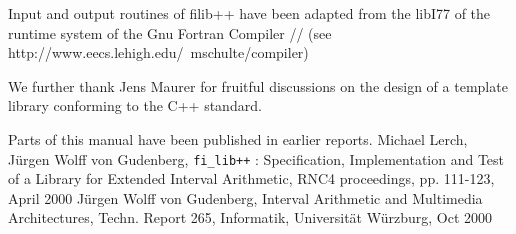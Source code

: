 \documentclass{report}
\begin{document}
\begin{thebibliography}{99}
Input and output routines of filib++ have been adapted from the libI77
of the
runtime system of the Gnu Fortran Compiler
// (see http://www.eecs.lehigh.edu/~mschulte/compiler)

We further thank Jens Maurer for fruitful discussions on the design of
a template library conforming to the C++ standard.

Parts of this manual have been published in earlier reports.
Michael Lerch,
J\"urgen Wolff von Gudenberg, { \texttt{fi\_lib++} : Specification, Implementation and Test of a Library for
Extended Interval Arithmetic}, RNC4 proceedings, pp. 111-123, April 2000
J\"urgen Wolff von Gudenberg, Interval Arithmetic and Multimedia
Architectures, Techn. Report 265, Informatik, Universit\"at
W\"urzburg, Oct 2000

\end{thebibliography}

 
\end{document}
